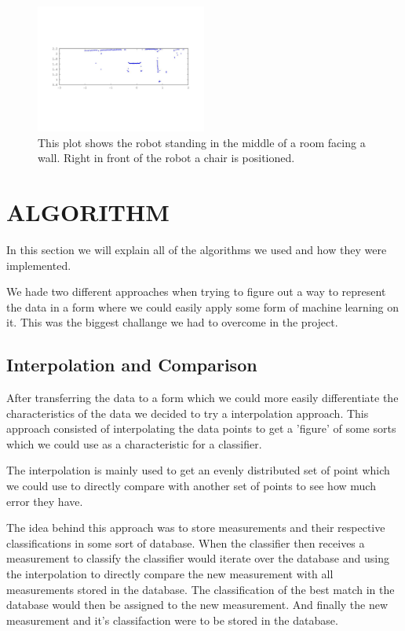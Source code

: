 \documentclass[a4paper, 10pt, conference]{ieeeconf}      %
\begin{document}
\begin{figure}
\centering
\includegraphics[width=0.5\textwidth]{presimg/chair.jpg}
\caption{This plot shows the robot standing in the middle of a room facing a wall. Right in front of the robot a chair is positioned.}
\label{chair}
\end{figure}

\section{ALGORITHM}
In this section we will explain all of the algorithms we used and how they were implemented. 

We hade two different approaches when trying to figure out a way to represent the data in a form where we could easily apply some form of machine learning on it. This was the biggest challange we had to overcome in the project. 

\subsection{Interpolation and Comparison}
After transferring the data to a form which we could more easily differentiate the characteristics of the data we decided to try a interpolation approach. This approach consisted of interpolating the data points to get a 'figure' of some sorts which we could use as a characteristic for a classifier.

The interpolation is mainly used to get an evenly distributed set of point which we could use to directly compare with another set of points to see how much error they have.

The idea behind this approach was to store measurements and their respective classifications in some sort of database. When the classifier then receives a measurement to classify the classifier would iterate over the database and using the interpolation to directly compare the new measurement with all measurements stored in the database. The classification of the best match in the database would then be assigned to the new measurement. And finally the new measurement and it's classifaction were to be stored in the database.
\end{document}
